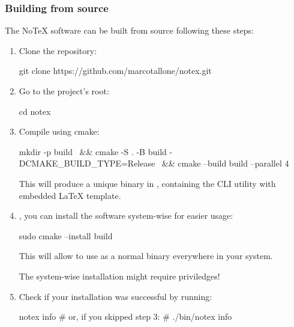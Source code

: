 \documentclass[../main.tex]{subfiles}
\begin{document}
\subsubsection{Building from source}

The NoTeX software can be built from source following these steps:

\begin{enumerate}
    \item Clone the repository:
    
        \begin{bash}
            git clone https://github.com/marcotallone/notex.git
        \end{bash}

    \item Go to the project's root:
    
        \begin{bash}
            cd notex
        \end{bash}

    \item Compile using cmake:
    
        \begin{bash}
            mkdir -p build \
            && cmake -S . -B build  -DCMAKE_BUILD_TYPE=Release \
            && cmake --build build --parallel 4
        \end{bash}

        This will produce a unique binary in , containing the CLI utility with embedded LaTeX template.

        
    \item {}, you can install the software system-wise for easier usage:
    
        \begin{bash}
            sudo cmake --install build
        \end{bash}

        This will allow to use  as a normal binary everywhere in your system.

        \begin{warning}
            The system-wise installation might require  priviledges!
        \end{warning}

    \item Check if your installation was successful by running:

        \begin{bash}
            notex info
            # or, if you skipped step 3:
            # ./bin/notex info
        \end{bash}


\end{enumerate}
\end{document}
